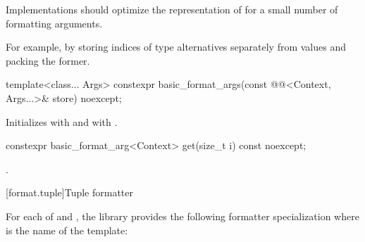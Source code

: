 \pnum
\recommended
Implementations should
optimize the representation of 
for a small number of formatting arguments.
\begin{note}
For example, by storing indices of type alternatives separately from values
and packing the former.
\end{note}

%
\begin{itemdecl}
template<class... Args>
  constexpr basic_format_args(const @@<Context, Args...>& store) noexcept;
\end{itemdecl}

\begin{itemdescr}
\pnum
\effects
Initializes
 with  and
 with .
\end{itemdescr}

%
\begin{itemdecl}
constexpr basic_format_arg<Context> get(size_t i) const noexcept;
\end{itemdecl}

\begin{itemdescr}
\pnum
\returns
{}.
\end{itemdescr}

[format.tuple]{Tuple formatter}

\pnum
For each of  and ,
the library provides the following formatter specialization
where  is the name of the template:

